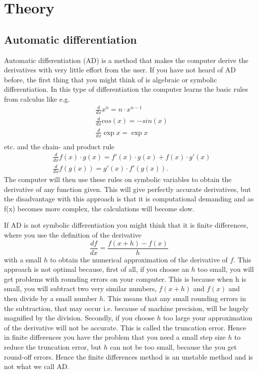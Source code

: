 \chapter{Theory}
\label{ch:theory}
\section{Automatic differentiation}
\label{sec:AD}
Automatic differentiation (AD) is a method that makes the computer derive the derivatives with very little effort from the user. If you have not heard of AD before, the first thing that you might think of is algebraic or symbolic differentiation. In this type of differentiation the computer learns the basic rules from calculus like e.g.
\begin{align*}
    &\frac{d}{dx}x^n     = n\cdot x^{n-1} \\
    &\frac{d}{dx}cos(x)  = -sin(x) \\
    &\frac{d}{dx}\exp{x} = \exp{x} \\
\end{align*}
etc. and the chain- and product rule
\begin{align*}
    &\frac{d}{dx}f(x)\cdot g(x) = f'(x)\cdot g(x) + f(x)\cdot g'(x) \\
    &\frac{d}{dx}f(g(x)) = g'(x)\cdot f'(g(x)).
\end{align*}
The computer will then use these rules on symbolic variables to obtain the derivative of any function given. This will give perfectly accurate derivatives, but the disadvantage with this approach is that it is computational demanding and as f(x) becomes more complex, the calculations will become slow.

If AD is not symbolic differentiation you might think that it is finite differences, where you use the definition of the derivative
\begin{equation*}
    \frac{df}{dx} = \frac{f(x+h) - f(x)}{h}
\end{equation*}
with a small $h$ to obtain the numerical approximation of the derivative of $f$. This approach is not optimal because, first of all, if you choose an $h$ too small, you will get problems with rounding errors on your computer. This is because when h is small, you will subtract two very similar numbers, $f(x+h)$ and $f(x)$ and then divide by a small number $h$. This means that any small rounding errors in the subtraction, that may occur i.e. because of machine precision, will be hugely magnified by the division. Secondly, if you choose $h$ too large your approximation of the derivative will not be accurate. This is called the truncation error. Hence in finite differences you have the problem that you need a small step size $h$ to reduce the truncation error, but $h$ can not be too small, because the you get round-off errors. Hence the finite differences method is an unstable method and is not what we call AD.

